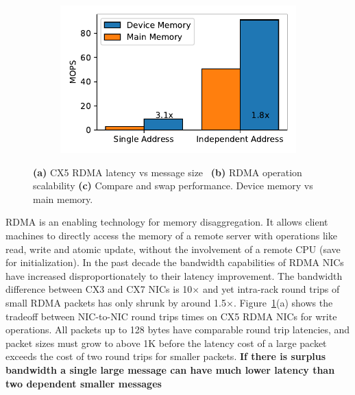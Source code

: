 \begin{figure}[t]
\begin{subfigure}{0.3\linewidth}
    \end{subfigure}
    \begin{subfigure}{0.3\linewidth}
        \includegraphics[width=0.99\linewidth]{fig/rdma_cas_throughput.pdf}
    \end{subfigure}
    \vspace{-1em}
    \caption{
    \textbf{(a)} CX5 RDMA latency vs message size~\cite{rdma-latency}
    \textbf{(b)} RDMA operation scalability
    \textbf{(c)} Compare and swap performance. Device memory vs main memory.
    }
    \label{fig:rdma-benchmarks}
\end{figure}

RDMA is an enabling technology for memory disaggregation. It
allows client machines to directly access the memory of a
remote server with operations like read, write and atomic
update, without the involvement of a remote CPU (save for
initialization).  
In the past decade the bandwidth
capabilities of RDMA NICs have increased disproportionately
to their latency improvement. The bandwidth difference
between CX3 and CX7 NICs is 10$\times$ and yet intra-rack
round trips of small RDMA packets has only shrunk by around
1.5$\times$.  Figure~\ref{fig:rdma-benchmarks}(a) shows the
tradeoff between NIC-to-NIC round trips times on CX5 RDMA
NICs for write operations. All packets up to 128 bytes have
comparable round trip latencies, and packet sizes must grow
to above 1K before the latency cost of a large packet
exceeds the cost of two round trips for smaller packets.
\textbf{If there is surplus bandwidth a single large message
can have much lower latency than two dependent smaller
messages}

